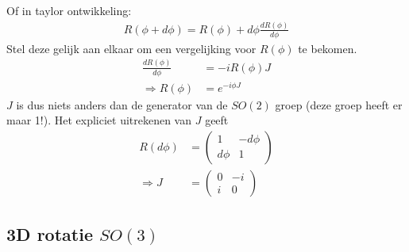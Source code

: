\documentclass[../main.tex]{subfiles}
\begin{document}
Of in taylor ontwikkeling:
\begin{equation}
    \begin{aligned}
        \label{eq:bepalen_J_2}
        R(\phi+d\phi) = R(\phi)+d\phi \frac{dR(\phi)}{d\phi}
    \end{aligned}
\end{equation}
Stel deze gelijk aan elkaar om een vergelijking voor $R(\phi)$ te bekomen.
\begin{equation}
    \begin{aligned}
        \label{eq:bepalen_J_3}
        \frac{dR(\phi)}{d\phi} &= -iR(\phi)J\\
        \Rightarrow R(\phi) &= e^{-i\phi J}
    \end{aligned}
\end{equation}
$J$ is dus niets anders dan de generator van de $SO(2)$ groep (deze groep heeft er maar 1!). Het expliciet uitrekenen van $J$ geeft
\begin{equation}
    \begin{aligned}
        \label{eq:j_expliciet}
        R(d\phi) &=
        \begin{pmatrix}
            1 & -d\phi \\
            d\phi & 1
        \end{pmatrix}\\
        \Rightarrow J&=
        \begin{pmatrix}
            0 & -i \\
            i & 0
        \end{pmatrix}
    \end{aligned}
\end{equation}

\subsection{3D rotatie $SO(3)$}%
\label{sub:3d_rotatie_so_3}
\end{document}
